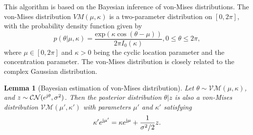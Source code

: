 \documentclass[12pt,draftclsnofoot,journal,onecolumn]{IEEEtran}
\newtheorem{lemma}{\bf Lemma}
\theoremstyle{nonumberplain}
\def \exp {\text{exp}}
\def \CN {\mathcal{CN}}
\def \VM {\mathcal{VM}}
\begin{document}
    This algorithm is based on the Bayesian inference of von-Mises distributions. The von-Mises distribution $VM(\mu, \kappa)$ is a two-parameter distribution on $[0, 2\pi]$, with the probability density function given by 
    \begin{equation}
        p(\theta|\mu, \kappa) = \frac{\exp(\kappa \cos(\theta - \mu))}{2\pi I_0(\kappa)}, 0\leq \theta \leq 2\pi,
    \end{equation}
    where $\mu \in [0,2\pi]$ and $\kappa >0$ being the cyclic location parameter and the concentration parameter. The von-Mises distribution is closely related to the complex Gaussian distribution.
    
    \begin{lemma}[Bayesian estimation of von-Mises distribution]\label{lemma_1}
        Let $\theta \sim \VM(\mu, \kappa)$, and $z \sim \CN(e^{{\rm j}\theta}, \sigma^2)$. Then the posterior distribution $\theta | z$ is also a von-Mises distribution $\VM(\mu', \kappa')$ with parameters $\mu'$ and $\kappa'$ satisfying
        \begin{equation}
            \kappa' e^{{\rm j}\mu'} = \kappa e^{{\rm j}\mu} + \frac{1}{\sigma^2/2}z.
        \end{equation}
    \end{lemma}
\end{document}
